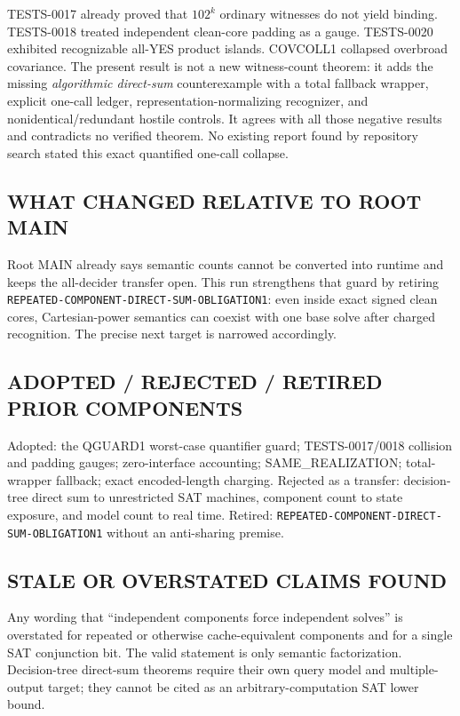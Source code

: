 \documentclass[11pt]{article}
\begin{document}
TESTS-0017 already proved that \(102^k\) ordinary witnesses do not yield
binding.  TESTS-0018 treated independent clean-core padding as a gauge.
TESTS-0020 exhibited recognizable all-YES product islands.  COVCOLL1 collapsed
overbroad covariance.  The present result is not a new witness-count theorem:
it adds the missing \emph{algorithmic direct-sum} counterexample with a total
fallback wrapper, explicit one-call ledger, representation-normalizing
recognizer, and nonidentical/redundant hostile controls.  It agrees with all
those negative results and contradicts no verified theorem.  No existing
report found by repository search stated this exact quantified one-call
collapse.

\subsection*{WHAT CHANGED RELATIVE TO ROOT MAIN}

Root MAIN already says semantic counts cannot be converted into runtime and
keeps the all-decider transfer open.  This run strengthens that guard by
retiring \texttt{REPEATED-COMPONENT-DIRECT-SUM-OBLIGATION1}: even inside exact
signed clean cores, Cartesian-power semantics can coexist with one base solve
after charged recognition.  The precise next target is narrowed accordingly.

\subsection*{ADOPTED / REJECTED / RETIRED PRIOR COMPONENTS}

Adopted: the QGUARD1 worst-case quantifier guard; TESTS-0017/0018 collision and
padding gauges; zero-interface accounting; SAME\_REALIZATION; total-wrapper
fallback; exact encoded-length charging.  Rejected as a transfer: decision-tree
direct sum to unrestricted SAT machines, component count to state exposure,
and model count to real time.  Retired:
\texttt{REPEATED-COMPONENT-DIRECT-SUM-OBLIGATION1} without an anti-sharing
premise.

\subsection*{STALE OR OVERSTATED CLAIMS FOUND}

Any wording that ``independent components force independent solves'' is
overstated for repeated or otherwise cache-equivalent components and for a
single SAT conjunction bit.  The valid statement is only semantic
factorization.  Decision-tree direct-sum theorems require their own query model
and multiple-output target; they cannot be cited as an arbitrary-computation
SAT lower bound.
\end{document}
